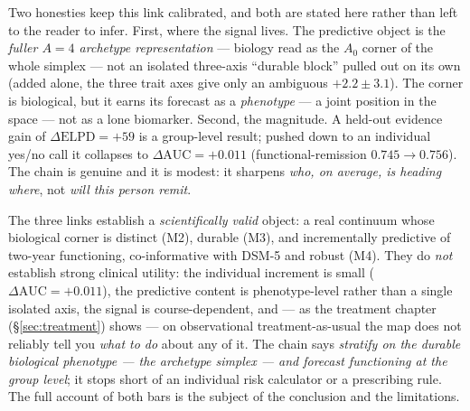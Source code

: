 Two honesties keep this link calibrated, and both are stated here rather than left to the reader to infer.
First, where the signal lives. The predictive object is the \emph{fuller $A=4$ archetype representation}
--- biology read as the $A_0$ corner of the whole simplex --- not an isolated three-axis ``durable block''
pulled out on its own (added alone, the three trait axes give only an ambiguous $+2.2\pm3.1$). The corner
is biological, but it earns its forecast as a \emph{phenotype} --- a joint position in the space --- not as
a lone biomarker. Second, the magnitude. A held-out evidence gain of $\Delta\text{ELPD}=+59$ is a
group-level result; pushed down to an individual yes/no call it collapses to $\Delta\text{AUC}=+0.011$
(functional-remission $0.745\to0.756$). The chain is genuine and it is modest: it sharpens \emph{who, on
average, is heading where}, not \emph{will this person remit}.

\begin{caveatbox}
The three links establish a \emph{scientifically valid} object: a real continuum whose biological corner is
distinct (M2), durable (M3), and incrementally predictive of two-year functioning, co-informative with
DSM-5 and robust (M4). They do \emph{not} establish strong clinical utility: the individual increment is
small ($\Delta\text{AUC}=+0.011$), the predictive content is phenotype-level rather than a single isolated
axis, the signal is course-dependent, and --- as the treatment chapter (\S\ref{sec:treatment}) shows --- on
observational treatment-as-usual the map does not reliably tell you \emph{what to do} about any of it. The
chain says \emph{stratify on the durable biological phenotype --- the archetype simplex --- and forecast
functioning at the group level}; it stops
short of an individual risk calculator or a prescribing rule. The full account of both bars is the subject
of the conclusion and the limitations.
\end{caveatbox}
